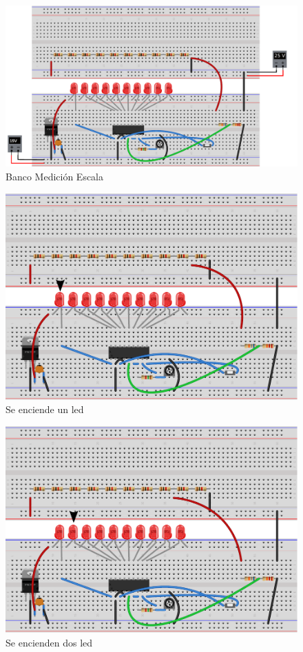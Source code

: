 \documentclass[12pt,a4paper]{article}
\begin{document}
			\begin{figure}[H]
			\centering
				\includegraphics[scale=0.8]{images/labo1_bb3.pdf}\caption{Banco Medición Escala}
			\end{figure}

			\begin{figure}[H]
			\centering
				\includegraphics[scale=0.9]{images/labo1_bb2.pdf}\caption{Se enciende un led}
			\end{figure}

			\begin{figure}[H]
			\centering
				\includegraphics[scale=0.9]{images/labo1_bb1.pdf}\caption{Se encienden dos led}
			\end{figure}
\end{document}
